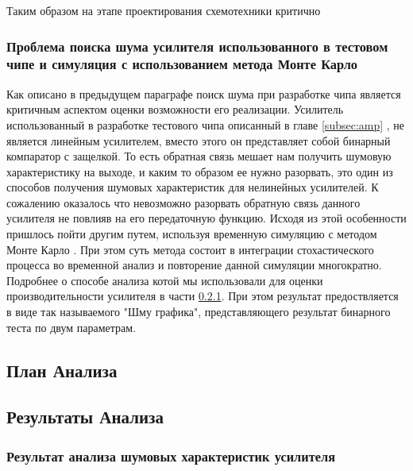 \documentclass[a4paper,12pt]{article} %
\begin{document}
Таким образом на этапе проектирования схемотехники критично 
 
\subsubsection{Проблема поиска шума усилителя использованного в тестовом чипе и симуляция с использованием метода Монте Карло}

Как описано в предыдущем параграфе поиск шума при разработке чипа является критичным аспектом оценки возможности его реализации. Усилитель использованный в разработке тестового чипа описанный в главе \ref{subsec:amp} , не является линейным усилителем, вместо этого он представляет собой бинарный компаратор с защелкой. То есть обратная связь мешает нам получить шумовую характеристику на выходе, и каким то образом ее нужно разорвать, это один из способов получения шумовых характеристик для нелинейных усилителей. К сожалению оказалось что невозможно разорвать обратную связь данного усилителя не повлияв на его передаточную функцию. Исходя из этой особенности пришлось пойти другим путем, используя временную симуляцию с методом Монте Карло \cite{carlo}. При этом суть метода состоит в интеграции стохастического процесса во временной анализ и повторение данной симуляции многократно. Подробнее о способе анализа котой мы использовали для оценки производительности усилителя в части \ref{subsec:amp_noise_test}. При этом результат предоствляется в виде так называемого "Шму графика", представляющего результат бинарного теста по двум параметрам.



\subsection{План Анализа}



\subsection{Результаты Анализа}

\subsubsection{Результат анализа шумовых характеристик усилителя}
\label{subsec:amp_noise_test}
\end{document}

